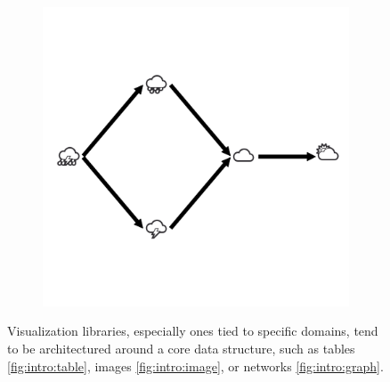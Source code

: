 \documentclass[../main.tex]{subfiles}
\begin{document}
\begin{figure}[H]
\begin{subfigure}{.3\textwidth}
        \includegraphics[width=1\textwidth]{figures/math/graph.png}
        \caption{}
        \label{fig:intro:graph}
    \end{subfigure}
    \caption{Visualization libraries, especially ones tied to specific domains, tend to be architectured around a core data structure, such as tables \autoref{fig:intro:table}, images \autoref{fig:intro:image}, or networks \autoref{fig:intro:graph}.
    }
    \label{fig:intro:data}
\end{figure}
\end{document}
